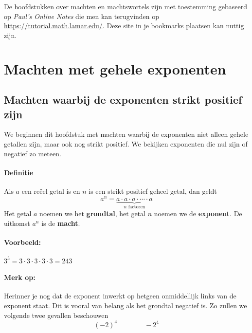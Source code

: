 \documentclass[12pt,twoside]{article}
\begin{document}
De hoofdstukken over machten en machtswortels zijn met toestemming gebaseerd op {\em Paul's Online Notes} die men kan terugvinden op \url{https://tutorial.math.lamar.edu/}. Deze site in je bookmarks plaatsen kan nuttig zijn.

\thispagestyle{empty}
\newpage


\pagestyle{fancy}
\fancyhead[RE,LO]{}

\section{Machten met gehele exponenten}

\subsection{Machten waarbij de exponenten strikt positief zijn}

We beginnen dit hoofdstuk met machten waarbij de exponenten niet alleen gehele getallen zijn, maar ook nog strikt positief. We bekijken exponenten die nul zijn of negatief zo meteen.

\paragraph*{Definitie}
\begin{mdframed}
  Als $a$ een reëel getal is en $n$ is een strikt positief geheel getal, dan geldt
  $$a^n = \underbrace{a \cdot a \cdot a \cdot \cdots \cdot a}_{n \text{ factoren}}$$
  Het getal $a$ noemen we het {\bf grondtal}, het getal $n$ noemen we de {\bf exponent}. De uitkomst $a^n$ is de {\bf macht}.
\end{mdframed}

\paragraph*{Voorbeeld:} $3^5 = 3 \cdot 3 \cdot 3 \cdot 3 \cdot 3 = 243$

\paragraph*{Merk op:} Herinner je nog dat de exponent inwerkt op hetgeen onmiddellijk links van de exponent staat. Dit is vooral van belang als het grondtal negatief is. Zo zullen we volgende twee gevallen beschouwen
$$(-2)^4 \qquad\qquad -2^4$$
\end{document}
